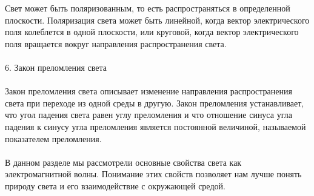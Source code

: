 \documentclass{article}
\begin{document}
Свет может быть поляризованным, то есть распространяться в определенной плоскости. Поляризация света может быть линейной, когда вектор электрического поля колеблется в одной плоскости, или круговой, когда вектор электрического поля вращается вокруг направления распространения света.\\
~\\
6. Закон преломления света\\
~\\
Закон преломления света описывает изменение направления распространения света при переходе из одной среды в другую. Закон преломления устанавливает, что угол падения света равен углу преломления и что отношение синуса угла падения к синусу угла преломления является постоянной величиной, называемой показателем преломления.\\
~\\
В данном разделе мы рассмотрели основные свойства света как электромагнитной волны. Понимание этих свойств позволяет нам лучше понять природу света и его взаимодействие с окружающей средой.
\end{document}
